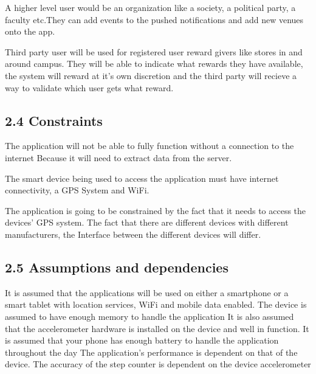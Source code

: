 \documentclass[11pt]{article}
\begin{document}
		A higher level user would be an organization like a society, a political party, a faculty etc.They can add events to the 		 pushed notifications and add new venues onto the app. 

		Third party user will be used for registered user reward givers like stores in and around campus. They will be able to 			indicate what rewards they have available, the system will reward at it’s own discretion and the third party will 			recieve a way to validate which user gets what reward.

		\subsection{2.4 Constraints}
		The application will not be able to fully function without a connection to the internet Because it will need to extract 		data from the server.

		The smart device being used to access the application must have internet connectivity, a GPS 
		System and WiFi.

		The application is going to be constrained by the fact that it needs to access the devices’ 
		GPS system. The fact that there are different devices with different manufacturers, the Interface between the different 		devices will differ.

		\subsection{2.5 Assumptions and dependencies}
		It is assumed that the applications will be used on either a smartphone or a smart tablet with location services, WiFi 			and mobile data enabled.
		The device is assumed to have enough memory to handle the application
		It is also assumed that the accelerometer hardware is installed on the device and well in function.
		It is assumed that your phone has enough battery to handle the application throughout the day
		The application’s performance is dependent on that of the device.
		The accuracy of the step counter is dependent on the device accelerometer


	
	
\end{document}

